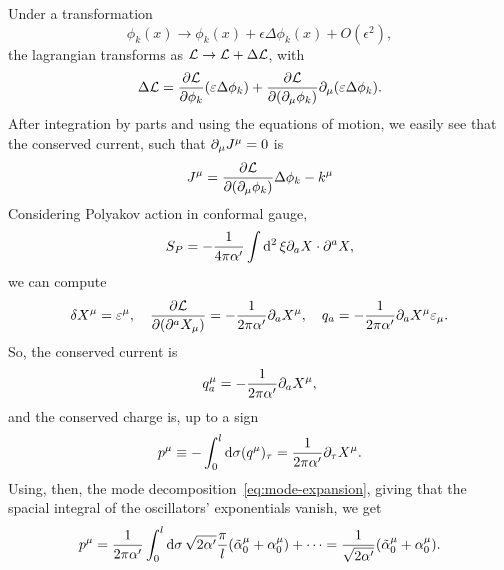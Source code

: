 \begin{mdframed}
\begin{innerproof}
    Under a transformation
    \begin{equation}
        \phi_k(x) \to \phi_k(x) + \epsilon \Delta\phi_k(x) + O(\epsilon^2),
    \end{equation}
    the lagrangian transforms as $\mathcal{L} \to \mathcal{L} + \Delta \mathcal{L}$, with
    \begin{equation}
        \Delta \mathcal{L} = \frac{\partial \mathcal{L}}{\partial \phi_k} (\varepsilon \Delta \phi_k) + \frac{\partial \mathcal{L}}{\partial(\partial_\mu \phi_k)} \partial_\mu (\varepsilon \Delta \phi_k) .
    \end{equation}
    After integration by parts and using the equations of motion, we easily see that the conserved current, such that $\partial_\mu J^\mu = 0$ is
    \begin{equation}
        J^\mu = \frac{\partial \mathcal{L}}{\partial(\partial_\mu \phi_k)} \Delta \phi_k - k^\mu
    \end{equation}
    Considering Polyakov action in conformal gauge, 
    \begin{equation}
    S_P = -\frac{1}{4\pi\alpha'}\int \mathop{}\!\mathrm{d}^2 \, \xi \partial_a X\cdot \partial^a X,
    \end{equation}
    we can compute
    \begin{equation*}
        \delta X^\mu = \varepsilon^\mu, \quad \frac{\partial \mathcal{L}}{\partial(\partial^a X_\mu)} = - \frac{1}{2\pi\alpha'} \partial_a X^\mu, \quad q_a = -\frac{1}{2\pi\alpha'} \partial_a X^\mu \varepsilon_\mu.
    \end{equation*}
    So, the conserved current is
    \begin{equation}
        q^\mu_a = - \frac{1}{2\pi\alpha'} \partial_a X^\mu,
    \end{equation}
    and the conserved charge is, up to a sign
    \begin{equation}
        p^\mu \equiv  -\int_0^l \mathop{}\!\mathrm{d} \sigma (q^\mu)_\tau = \frac{1}{2\pi\alpha'} \partial_\tau X^\mu.
    \end{equation}
    Using, then, the mode decomposition~\eqref{eq:mode-expansion}, giving that the spacial integral of the oscillators' exponentials vanish, we get
    \begin{equation}
        p^\mu = \frac{1}{2\pi\alpha'} \int_0^l \mathop{}\!\mathrm{d} \sigma \, \sqrt{2\alpha'} \frac{\pi}{l} (\tilde{\alpha}^\mu_0 + \alpha^\mu_0) + \dots = \frac{1}{\sqrt{2\alpha'}} (\tilde{\alpha}^\mu_0 + \alpha^\mu_0).
    \end{equation}
\end{innerproof}
\end{mdframed}


